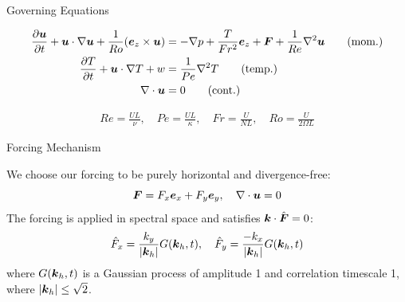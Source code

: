 \documentclass{beamer}
\begin{document}
\begin{frame}{Governing Equations}

    {\small
    \begin{align}
        \frac{\partial \boldsymbol{u}}{\partial t} + \boldsymbol{u} \cdot \nabla \boldsymbol{u} +
        \frac{1}{Ro}(\boldsymbol{e}_z \times
        \boldsymbol{u}) &= -\nabla p +
        \frac{T}{Fr^2}\boldsymbol{e}_z + \boldsymbol{F} + \frac{1}{Re}\nabla^2\boldsymbol{u} \tag{mom.}\label{eq:momentum}\\
        \frac{\partial T}{\partial t} + \boldsymbol{u} \cdot \nabla T + w &= \frac{1}{Pe}\nabla^2T \tag{temp.} \label{eq:temp} \\
        \nabla \cdot \boldsymbol{u} &= 0 \tag{cont.}\label{eq:cont}
    \end{align}
    
    \begin{align*}
        Re = \frac{UL}{\nu}, \quad Pe = \frac{UL}{\kappa}, \quad Fr =
        \frac{U}{NL}, \quad Ro = \frac{U}{2\Omega L}
    \end{align*}
    }

\end{frame}

\begin{frame}{Forcing Mechanism}

    We choose our forcing to be purely horizontal and divergence-free:
    \[
        \boldsymbol{F} = F_x\boldsymbol{e}_x + F_y\boldsymbol{e}_y, \quad \nabla \cdot \boldsymbol{u} = 0
    \]
    The forcing is applied in spectral space and satisfies $\boldsymbol{k} \cdot \hat{\boldsymbol{F}} = 0$:
    \begin{gather*}
        \hat{F}_x = \frac{k_y}{|\boldsymbol{k}_h|}G(\boldsymbol{k}_h,t), \quad \hat{F}_y = \frac{-k_x}{|\boldsymbol{k}_h|}G(\boldsymbol{k}_h,t)\\
    \end{gather*}
    where $G(\boldsymbol{k}_h,t)$ is a Gaussian process of amplitude 1 and correlation
    timescale 1, where $|\boldsymbol{k}_h| \le \sqrt{2}$. 


\end{frame}
\end{document}
